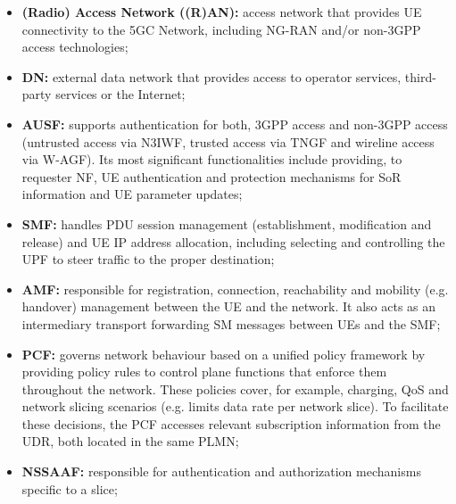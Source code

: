 \begin{itemize}
    \item{\textbf{(Radio) Access Network ((R)AN):}} access network that provides \ac{UE} connectivity to the \ac{5GC} Network, including \acf{NG-RAN} and/or non-3GPP access technologies;

    \item{\textbf{\acf{DN}:}} external data network that provides access to operator services, third-party services or the Internet;

    \item{\textbf{\acf{AUSF}:}} supports authentication for both, \acs{3GPP} access and non-3GPP access (untrusted access via \acs{N3IWF}, trusted access via \acs{TNGF} and wireline access via \acs{W-AGF}). Its most significant functionalities include providing, to requester \acs{NF}, \acs{UE} authentication and protection mechanisms for \ac{SoR} information and \acs{UE} parameter updates;

    \item{\textbf{\acf{SMF}:}} handles \ac{PDU} session management (establishment, modification and release) and \ac{UE} \ac{IP} address allocation, including selecting and controlling the \ac{UPF} to steer traffic to the proper destination; 
    
    \item{\textbf{\acf{AMF}:}} responsible for registration, connection, reachability and mobility (e.g. handover) management between the \ac{UE} and the network. It also acts as an intermediary transport forwarding \ac{SM} messages between \acp{UE} and the \ac{SMF};

    \item{\textbf{\acf{PCF}:}} governs network behaviour based on a unified policy framework by providing policy rules to control plane functions that enforce them throughout the network. These policies cover, for example, charging, \acs{QoS} and network slicing scenarios (e.g. limits data rate per network slice). To facilitate these decisions, the \acs{PCF} accesses relevant subscription information from the \acs{UDR}, both located in the same \acs{PLMN};

    \item{\textbf{\acf{NSSAAF}:}} responsible for authentication and authorization mechanisms specific to a slice;


\end{itemize}
